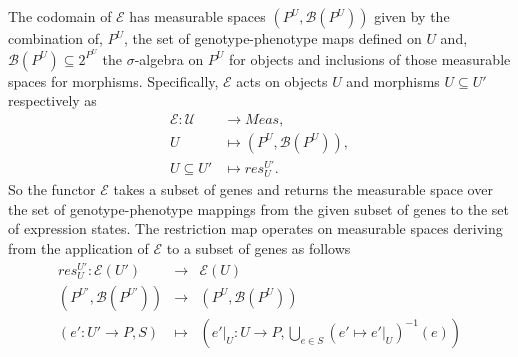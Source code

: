 The codomain of $\mathcal{E}$ has measurable spaces $(P^U,\mathcal{B}(P^U))$ given by the combination of, $P^U$, the set of genotype-phenotype maps defined on $U$ and, $\mathcal{B}(P^U) \subseteq 2^{P^U}$ the $\sigma$-algebra on $P^U$ for objects and inclusions of those measurable spaces for morphisms. Specifically, $\mathcal{E}$ acts on objects $U$ and morphisms $U \subseteq U'$ respectively as
\begin{equation}\label{eq:gpfunctor}
\begin{split}
\mathcal{E} \colon \mathcal{U} &\rightarrow Meas,\\
U &\mapsto (P^U, \mathcal{B}(P^U)),\\
U \subseteq U' &\mapsto res^{U'}_{U}.
\end{split}
\end{equation}
So the functor $\mathcal{E}$ takes a subset of genes and returns the measurable space over the set of genotype-phenotype mappings from the given subset of genes to the set of expression states. The restriction map operates on measurable spaces deriving from the application of $\mathcal{E}$ to a subset of genes as follows
\begin{eqnarray*}
res^{U'}_{U} \colon \mathcal{E}(U') &\rightarrow& \mathcal{E}(U)\\
(P^{U'},\mathcal{B}(P^{U'})) &\rightarrow& (P^U,\mathcal{B}(P^U))\\
(e' \colon U' \rightarrow P, S) &\mapsto& (e'|_U \colon U \rightarrow P, \bigcup_{e \in S}(e' \mapsto e'|_U)^{-1}(e))
\end{eqnarray*}


